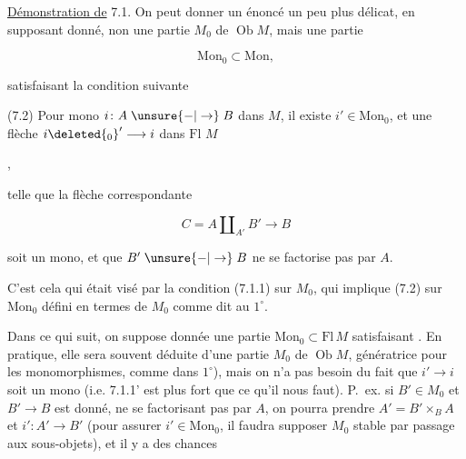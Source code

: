 

\uline{Démonstration de} 7.1. On peut donner un énoncé un peu plus délicat, en supposant  donné, non une partie $M_0$ de $\operatorname{Ob}M$, mais une partie

\[
\mathrm{Mon}_0\subset\mathrm{Mon},\tag*{(7.1)}
\]

satisfaisant la condition suivante

(7.2) Pour   mono $i\colon A\mathrel{\unsure{-|\to}} B$ dans $M$, il existe  $i'\in\mathrm{Mon}_0$, et une flèche $i\deleted{_0}'\longrightarrow i$ dans \uline{$\mathrm{Fl}$} $M$

\hfill,

telle que la flèche correspondante 

\[
C=A\amalg_{A'}B'\longrightarrow B
\]

soit un mono, et que $B'\mathrel{\unsure{-|\to}}B$ ne se factorise pas par $A$.

C'est cela qui était visé par la condition (7.1.1) sur $M_0$, qui implique (7.2) sur $\mathrm{Mon}_0$ défini en termes de $M_0$ comme dit au $1^\circ$.

Dans ce qui suit, on suppose donnée une partie $\mathrm{Mon}_0\subset\mathrm{Fl}\,M$ satisfaisant . En pratique, elle sera souvent déduite d'une partie $M_0$ de $\operatorname{Ob}M$, génératrice pour les monomorphismes, comme  dans $1^\circ$), mais on n'a pas besoin du fait que $i'\longrightarrow i$ soit un mono (i.e. 7.1.1' est plus fort que ce qu'il nous faut). P.~ex. si $B'\in M_0$ et $B'\longrightarrow B$ est donné, ne se factorisant pas par $A$, on pourra prendre $A'=B'\times_B A$ et $i'\colon A'\longrightarrow B'$ (pour assurer $i'\in\mathrm{Mon}_0$, il faudra  supposer $M_0$ stable par passage aux sous-objets), et il y a des chances
